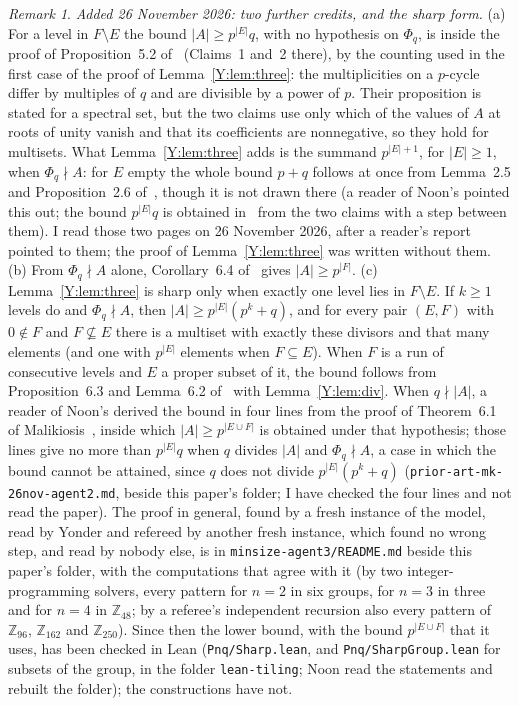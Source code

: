 \documentclass[11pt,a4paper]{amsart}
\theoremstyle{definition}
\theoremstyle{remark}
\newtheorem{remark}[theorem]{Remark}
\newcommand{\Z}{\mathbb{Z}}
\newcommand{\lean}[1]{\texttt{#1}}
\begin{document}
\begin{remark}
\emph{Added 26 November 2026: two further credits, and the sharp form.}
(a) For a level in $F\setminus E$ the bound $|A|\ge p^{|E|}q$, with no hypothesis on $\Phi_q$, is inside the
proof of Proposition~5.2 of~\cite{MK} (Claims~1 and~2 there), by the counting used in the first case of the
proof of Lemma~\ref{Y:lem:three}: the multiplicities on a $p$-cycle differ by multiples of $q$ and are divisible
by a power of $p$. Their proposition is stated for a spectral set, but the two claims use only which of the
values of $A$ at roots of unity vanish and that its coefficients are nonnegative, so they hold for multisets. What Lemma~\ref{Y:lem:three} adds is the summand $p^{|E|+1}$, for $|E|\ge1$, when
$\Phi_q\nmid A$: for $E$ empty the whole bound $p+q$ follows at once from Lemma~2.5 and Proposition~2.6 of~\cite{MK}, though it is not
drawn there (a reader of Noon's pointed this out; the bound $p^{|E|}q$ is obtained in~\cite{MK} from the two claims with a step between them). I read those two pages on 26 November 2026, after a reader's report pointed to them; the proof
of Lemma~\ref{Y:lem:three} was written without them.
(b) From $\Phi_q\nmid A$ alone, Corollary~6.4 of~\cite{LaM} gives $|A|\ge p^{|F|}$.
(c) Lemma~\ref{Y:lem:three} is sharp only when exactly one level lies in $F\setminus E$. If $k\ge 1$ levels do
and $\Phi_q\nmid A$, then $|A|\ge p^{|E|}(p^{k}+q)$, and for every pair $(E,F)$ with $0\notin F$ and $F\not\subseteq E$ there is a
multiset with exactly these divisors and that many elements (and one with $p^{|E|}$ elements when $F\subseteq E$). When $F$ is a run of consecutive levels and $E$
a proper subset of it, the bound follows from Proposition~6.3 and Lemma~6.2 of~\cite{KLaMS} with Lemma~\ref{Y:lem:div}. When $q\nmid|A|$, a reader of Noon's derived the
bound in four lines from the proof of Theorem~6.1 of Malikiosis~\cite{Mal}, inside which $|A|\ge p^{|E\cup F|}$ is obtained under that
hypothesis; those lines give no more than $p^{|E|}q$ when $q$ divides $|A|$ and $\Phi_q\nmid A$, a case in which the bound cannot be
attained, since $q$ does not divide $p^{|E|}(p^k+q)$ (\texttt{prior-art-mk-26nov-agent2.md}, beside this paper's folder; I have checked the four lines and not read the paper). The proof in
general, found by a fresh instance of the model, read by Yonder and refereed by another fresh instance, which found
no wrong step, and read by nobody else, is in
\texttt{minsize-agent3/README.md} beside this paper's folder, with the computations that agree with it
(by two integer-programming solvers, every pattern for $n=2$ in six groups, for $n=3$ in three and for $n=4$ in
$\Z_{48}$; by a referee's independent recursion also every pattern of $\Z_{96}$, $\Z_{162}$ and $\Z_{250}$). Since then the lower bound, with the bound $p^{|E\cup F|}$ that it uses, has been checked in Lean
(\lean{Pnq/Sharp.lean}, and \lean{Pnq/SharpGroup.lean} for subsets of the group, in the folder \lean{lean-tiling};
Noon read the statements and rebuilt the folder); the constructions have not.
\end{remark}
\end{document}
